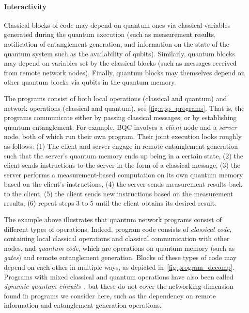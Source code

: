 \paragraph{Interactivity}
Classical blocks of code may depend on quantum ones via classical variables generated during the quantum execution (such as measurement results, notification of entanglement generation, and information on the state of the quantum system such as the availability of qubits).
Similarly, quantum blocks may depend on variables set by the classical blocks (such as messages received from remote network nodes).
Finally, quantum blocks may themselves depend on other quantum blocks via qubits in the quantum memory. 

The programs consist of both local operations (classical and quantum) and network operations (classical and quantum), see \cref{fig:app_programs}.
That is, the programs communicate either by passing classical messages, or by establishing quantum entanglement.
For example, BQC involves a \textit{client} node and a \textit{server} node, both of which run their own program.
Their joint execution looks roughly as follows:
    (1) The client and server engage in remote entanglement generation such that the server's quantum memory ends up being in a certain state,
    (2) the client sends instructions to the server in the form of a classical message,
    (3) the server performs a measurement-based computation on its own quantum memory based on the client's instructions,
    (4) the server sends measurement results back to the client,
    (5) the client sends new instructions based on the measurement results,
    (6) repeat steps 3 to 5 until the client obtains its desired result.

The example above illustrates that quantum network programs consist of different
types of operations.
Indeed, program code consists of \textit{classical code}, containing local classical operations and classical communication with other nodes, and \textit{quantum code}, which are operations on quantum memory (such as \textit{gates}) and remote entanglement generation.
Blocks of these types of code may depend on each other in multiple ways, as depicted in~\cref{fig:program_decomp}.
Programs with mixed classical and quantum operations have also been called \textit{dynamic quantum circuits}~\cite{cross2021openqasm, burgholzer2021towards}, but these do not cover the networking dimension found in programs we consider here, such as the dependency on remote information and entanglement generation operations.

